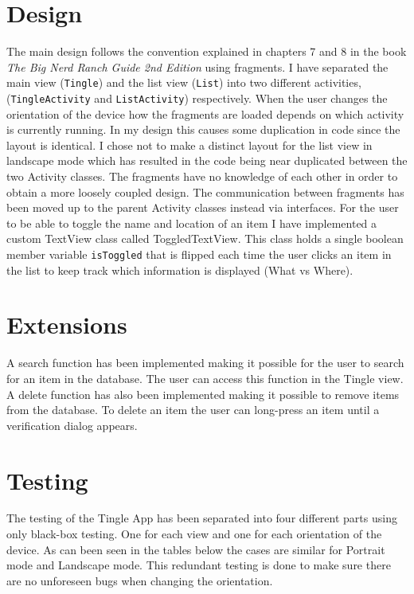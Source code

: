 \section{Design}
The main design follows the convention explained in chapters 7 and 8 in the book \emph{The Big Nerd Ranch Guide 2nd Edition} using fragments.
I have separated the main view (\texttt{Tingle}) and the list view (\texttt{List}) into two different 
activities, (\texttt{TingleActivity} and \texttt{ListActivity}) respectively. When the user changes the orientation of the device how the fragments are loaded depends on which activity is
currently running. In my design this causes some duplication in code since the layout is identical. I chose 
not to make a distinct layout for the list view in landscape mode which has resulted in the code being near duplicated between the two Activity classes.
The fragments have no knowledge of each other in order to obtain a more loosely coupled design.
The communication between fragments has been moved up to the parent Activity classes instead via interfaces.
For the user to be able to toggle the name and location of an item I have implemented a custom TextView class
called ToggledTextView. This class holds a single boolean member variable \texttt{isToggled} that is flipped each time the user clicks an item in the list to keep track which information is displayed (What vs Where).

\section{Extensions }
A search function has been implemented making it possible for the user to search for an item in 
the database. The user can access this function in the Tingle view.
A delete function has also been implemented making it possible to remove items from the database. To delete an item the user can long-press an item until a verification dialog appears.

\section{Testing}
The testing of the Tingle App has been separated into four different parts using only black-box testing. One for each view and one for each orientation of the device. As can been seen in the tables below the cases are similar for Portrait mode and Landscape mode. This redundant testing is done to make sure there are no unforeseen bugs when changing the orientation.

